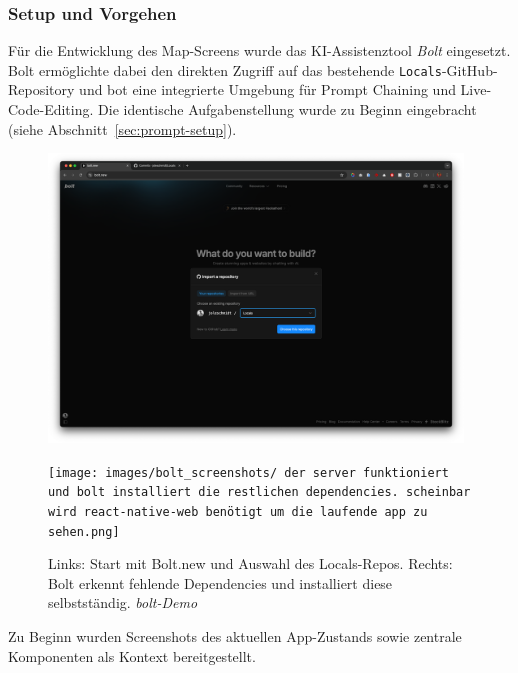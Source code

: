 \subsubsection{Setup und Vorgehen}
Für die Entwicklung des Map-Screens wurde das KI-Assistenztool \textit{Bolt}
eingesetzt. Bolt ermöglichte dabei den direkten Zugriff auf das bestehende
\texttt{Locals}-GitHub-Repository und bot eine integrierte Umgebung für Prompt
Chaining und Live-Code-Editing. Die identische Aufgabenstellung wurde zu Beginn
eingebracht (siehe Abschnitt~\ref{sec:prompt-setup}).

\begin{figure}[htbp]
      \centering
      \vspace{1em}
      \begin{minipage}{0.48\textwidth}
            \centering
            \includegraphics[width=0.98\textwidth]{images/bolt_screenshots/startseite-what-do-you-wanna-build-mit-github-branch.png}
      \end{minipage}
      \hfill
      \begin{minipage}{0.48\textwidth}
            \centering
            \texttt{[image: images/bolt\_screenshots/ der server funktioniert und bolt installiert die restlichen dependencies. scheinbar wird react-native-web benötigt um die laufende app zu sehen.png]}
      \end{minipage}
      \caption{Links: Start mit Bolt.new und Auswahl des Locals-Repos. Rechts: Bolt erkennt fehlende Dependencies und installiert diese selbstständig. \textit{bolt-Demo}}
      \label{fig:bolt-setup}
\end{figure}

Zu Beginn wurden Screenshots des aktuellen App-Zustands sowie zentrale
Komponenten als Kontext bereitgestellt.

